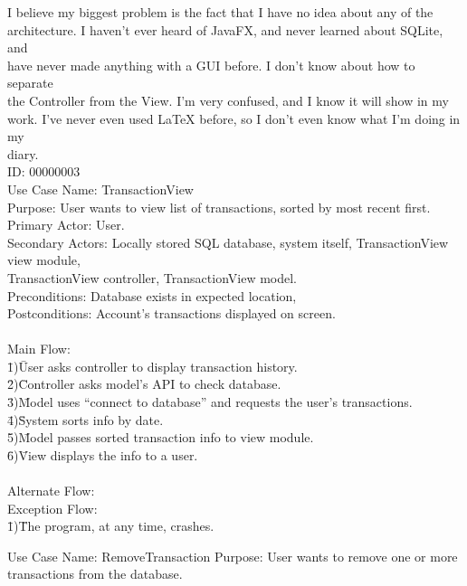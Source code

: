 \documentclass[letterpaper,12pt,oneside,titlepage,onecolumn]{article}
\author{Matthew Dugal, 40000361}
\date{2/7/2018}
\begin{document}
\begin{tabbing}
I believe my biggest problem is the fact that I have no idea about any of the\\ architecture. I haven't ever heard of JavaFX, and never learned about SQLite, and\\ have never made anything with a GUI before. I don't know about how to separate\\ the Controller from the View. I'm very confused, and I know it will show in my\\ work. I've never even used LaTeX before, so I don't even know what I'm doing in my\\
diary.\\

ID: 00000003\\
Use Case Name: TransactionView\\
Purpose: User wants to view list of transactions, sorted by most recent first.\\
Primary Actor: User.\\
Secondary Actors: Locally stored SQL database, system itself, TransactionView view module,\\ TransactionView controller, TransactionView model.\\
Preconditions: Database exists in expected location,\\
Postconditions: Account’s transactions displayed on screen.\\
\\
Main Flow:\\
\=1)\=User asks controller to display transaction history.\\
\=2)\=Controller asks model’s API to check database.\\
\=3)\=Model uses “connect to database” and requests the user’s transactions.\\
\=4)\=System sorts info by date.\\
\=5)\=Model passes sorted transaction info to view module.\\
\=6)\=View displays the info to a user.\\
\\
Alternate Flow:
\\
Exception Flow:\\
\=1)\=The program, at any time, crashes.\\
\end{tabbing}

Use Case Name: RemoveTransaction
Purpose: User wants to remove one or more transactions from the database.
\end{document}
